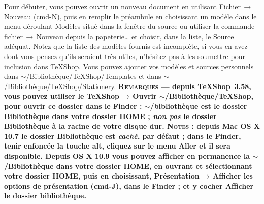 \documentclass[11pt,french]{article}
\newcommand{\TS}{\textsf{\TeX Shop}}
\newcommand{\cmd}[1]{\textsf{#1}}
\newcommand{\mnu}[1]{\textsf{#1}}
\newcommand{\To}{\,\(\to\)\,}
\begin{document}
Pour débuter, vous pouvez ouvrir un nouveau document en utilisant \mnu{Fichier}\To\mnu{Nouveau} \mbox{(\cmd{cmd-N})}, puis en remplir le préambule en choisissant un modèle dans le menu déroulant \mnu{Modèles} situé dans la fenêtre du source ou utiliser la commande \mnu{fichier}\To\mnu{Nouveau depuis la papeterie…} et choisir, dans la liste, le \mnu{Source} adéquat. Notez que la liste des modèles fournis est incomplète, si vous en avez dont vous pensez qu'ils seraient très utiles, n'hésitez pas à les soumettre pour inclusion dans \TS. Vous pouvez ajouter vos modèles et sources personnels dans \cmd{$\sim$/Bibliothèque/TeXShop/Templates} et dans \cmd{$\sim$/Bibliothèque/TeXShop/Stationery}. \textbf{\textsc{Remarques} ---  depuis \TS\ 3.58, vous pouvez utiliser le \mnu{TeXShop}\To\mnu{Ouvrir \cmd{$\sim$/Bibliothèque/TeXShop}}, pour ouvrir ce dossier dans le Finder : \cmd{$\sim$/bibliothèque} est le dossier \cmd{Bibliothèque} dans votre dossier \cmd{HOME} ; \emph{non pas} le dossier \cmd{Bibliothèque} à la \cmd{racine} de votre disque dur. \textsc{Notes} : depuis \textsf{Mac OS X 10.7} le dossier \cmd{Bibliothèque} est \emph{caché}, par défaut ; dans le \cmd{Finder}, tenir enfoncée la touche \cmd{alt}, cliquez sur le menu \mnu{Aller} et il sera disponible. Depuis \textsf{OS X 10.9} vous pouvez afficher en permanence la \cmd{$\sim$/Bibliothèque} dans votre dossier \cmd{HOME}, en ouvrant et sélectionnant votre dossier \cmd{HOME}, puis en choisissant, \mnu{Présentation}\To\mnu{Afficher les options de présentation} (\cmd{cmd-J}), dans le \cmd{Finder} ; et y cocher \cmd{Afficher le dossier bibliothèque}.}

\end{document}
